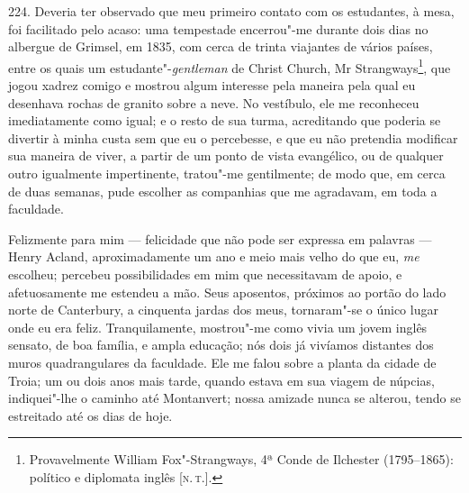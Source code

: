 224. Deveria ter observado que meu primeiro contato com os estudantes, à
mesa, foi facilitado pelo acaso: uma tempestade encerrou"-me durante dois
dias no albergue de Grimsel, em 1835, com cerca de trinta viajantes de
vários países, entre os quais um estudante"-\emph{gentleman} de Christ
Church, Mr Strangways\footnote{Provavelmente William Fox"-Strangways, 4ª
  Conde de Ilchester (1795--1865): político e diplomata inglês {[}\textsc{n.\,t.}{]}.}, que jogou xadrez comigo e mostrou algum interesse pela
maneira pela qual eu desenhava rochas de granito sobre a neve. No
vestíbulo, ele me reconheceu imediatamente como igual; e o resto de sua
turma, acreditando que poderia se divertir à minha custa sem que eu o
percebesse, e que eu não pretendia modificar sua maneira de viver, a
partir de um ponto de vista evangélico, ou de qualquer outro igualmente
impertinente, tratou"-me gentilmente; de modo que, em cerca de duas
semanas, pude escolher as companhias que me agradavam, em toda a
faculdade.

Felizmente para mim --- felicidade que não pode ser expressa em palavras
--- Henry Acland, aproximadamente um ano e meio mais velho do que eu,
\emph{me} escolheu; percebeu possibilidades em mim que necessitavam de
apoio, e afetuosamente me estendeu a mão. Seus aposentos, próximos ao
portão do lado norte de Canterbury, a cinquenta jardas dos meus,
tornaram"-se o único lugar onde eu era feliz. Tranquilamente, mostrou"-me
como vivia um jovem inglês sensato, de boa família, e ampla educação;
nós dois já vivíamos distantes dos muros quadrangulares da faculdade.
Ele me falou sobre a planta da cidade de Troia; um ou dois anos mais
tarde, quando estava em sua viagem de núpcias, indiquei"-lhe o caminho
até Montanvert; nossa amizade nunca se alterou, tendo se estreitado até
os dias de hoje.


